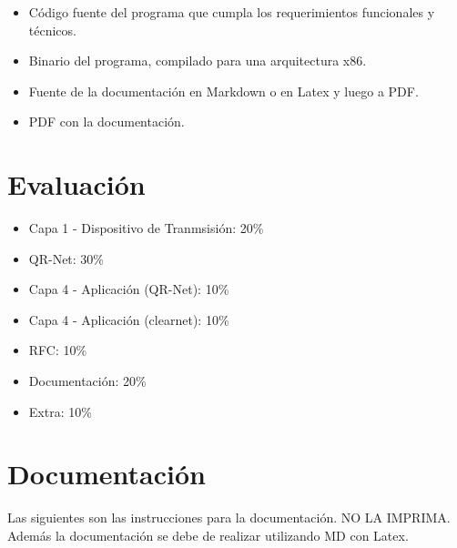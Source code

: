 \documentclass[11pt,a4paper]{scrartcl}			%
\providecommand{\tightlist}{%
          \setlength{\itemsep}{0pt}\setlength{\parskip}{0pt}}
\begin{document}
\begin{multicols*}{2}
\begin{itemize}
\tightlist
\item
  Código fuente del programa que cumpla los requerimientos funcionales y
  técnicos.
\item
  Binario del programa, compilado para una arquitectura x86.
\item
  Fuente de la documentación en Markdown o en Latex y luego a PDF.
\item
  PDF con la documentación.
\end{itemize}

\section{Evaluación}\label{evaluaciuxf3n}

\begin{itemize}
\tightlist
\item
  Capa 1 - Dispositivo de Tranmsisión: 20\%
\item
  QR-Net: 30\%
\item
  Capa 4 - Aplicación (QR-Net): 10\%
\item
  Capa 4 - Aplicación (clearnet): 10\%
\item
  RFC: 10\%
\item
  Documentación: 20\%
\item
  Extra: 10\%
\end{itemize}

\section{Documentación}\label{documentaciuxf3n}

Las siguientes son las instrucciones para la documentación. NO LA
IMPRIMA. Además la documentación se debe de realizar utilizando MD con
Latex.


\end{multicols*}
\end{document}
